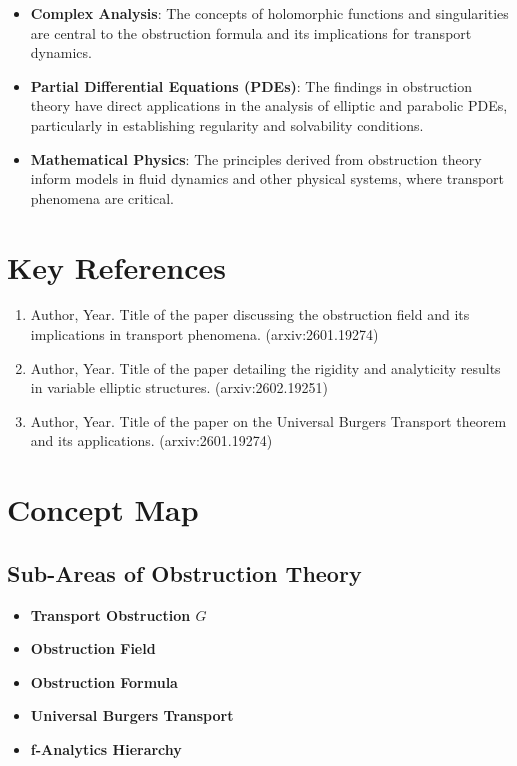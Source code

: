 \documentclass[11pt,a4paper]{article}
\begin{document}
\begin{itemize}
\item \textbf{Complex Analysis}: The concepts of holomorphic functions and singularities are central to the obstruction formula and its implications for transport dynamics.
\end{itemize}

\begin{itemize}
\item \textbf{Partial Differential Equations (PDEs)}: The findings in obstruction theory have direct applications in the analysis of elliptic and parabolic PDEs, particularly in establishing regularity and solvability conditions.
\end{itemize}

\begin{itemize}
\item \textbf{Mathematical Physics}: The principles derived from obstruction theory inform models in fluid dynamics and other physical systems, where transport phenomena are critical.
\end{itemize}

\section{Key References}

\begin{enumerate}
\item Author, Year. Title of the paper discussing the obstruction field and its implications in transport phenomena. (arxiv:2601.19274)
\item Author, Year. Title of the paper detailing the rigidity and analyticity results in variable elliptic structures. (arxiv:2602.19251)
\item Author, Year. Title of the paper on the Universal Burgers Transport theorem and its applications. (arxiv:2601.19274)
\end{enumerate}

\section{Concept Map}

\subsection{Sub-Areas of Obstruction Theory}
\begin{itemize}
\item \textbf{Transport Obstruction \( G \)}
\item \textbf{Obstruction Field}
\item \textbf{Obstruction Formula}
\item \textbf{Universal Burgers Transport}
\item \textbf{f-Analytics Hierarchy}
\end{itemize}
\end{document}
